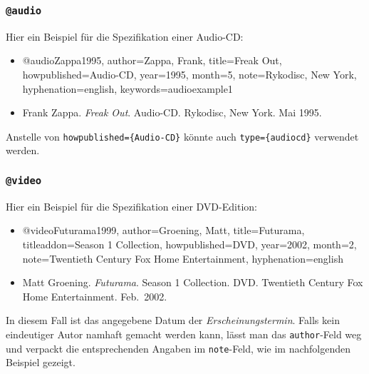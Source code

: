 \subsubsection{\texttt{@audio}}
\label{sec:@audio}
Hier ein Beispiel für die Spezifikation einer Audio-CD:
%
\begin{itemize}
\item[] 
\begin{GenericCode}[numbers=none]
@audio{Zappa1995,
  author={Zappa, Frank},
  title={Freak Out},
  howpublished={Audio-CD},
  year={1995},
  month={5},
  note={Rykodisc, New York},
  hyphenation={english},
  keywords={audioexample1}
}
\end{GenericCode}
\item[\cite{Zappa1995}]
Frank Zappa. \textit{Freak Out}. Audio-CD. Rykodisc, New York. Mai 1995.
\end{itemize}
%
Anstelle von \verb!howpublished={Audio-CD}! könnte auch 
\verb!type={audiocd}! verwendet werden.


\subsubsection{\texttt{@video}}
\label{sec:@video}
Hier ein Beispiel für die Spezifikation einer DVD-Edition:
%
\begin{itemize}
\item[] 
\begin{GenericCode}[numbers=none]
@video{Futurama1999,
  author={Groening, Matt},
  title={Futurama},
	titleaddon={Season 1 Collection},
  howpublished={DVD},
  year={2002},
  month={2},
  note={Twentieth Century Fox Home Entertainment},
  hyphenation={english}
 }
\end{GenericCode}
\item[\cite{Futurama1999}]
Matt Groening. \textit{Futurama}. Season 1 Collection. DVD. 
Twentieth Century Fox Home Entertainment. Feb.\ 2002.
\end{itemize}
%
In diesem Fall ist das angegebene Datum der \emph{Erscheinungstermin}. 
Falls kein eindeutiger Autor namhaft gemacht werden kann, lässt man das
\texttt{author}-Feld weg und verpackt die entsprechenden Angaben im \texttt{note}-Feld, wie im nachfolgenden Beispiel gezeigt.


